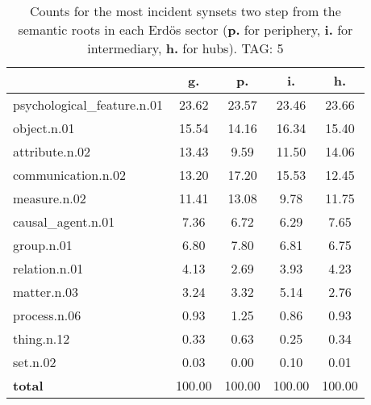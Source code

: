 \begin{table}[h!]
\begin{center}
\begin{tabular}{| l | c | c | c | c |}\hline
 & g. & p. & i. & h. \\\hline
psychological\_feature.n.01 & 23.62  & 23.57  & 23.46  & 23.66 \\\hline
object.n.01 & 15.54  & 14.16  & 16.34  & 15.40 \\\hline
attribute.n.02 & 13.43  & 9.59  & 11.50  & 14.06 \\\hline
communication.n.02 & 13.20  & 17.20  & 15.53  & 12.45 \\\hline
measure.n.02 & 11.41  & 13.08  & 9.78  & 11.75 \\\hline
causal\_agent.n.01 & 7.36  & 6.72  & 6.29  & 7.65 \\\hline
group.n.01 & 6.80  & 7.80  & 6.81  & 6.75 \\\hline
relation.n.01 & 4.13  & 2.69  & 3.93  & 4.23 \\\hline
matter.n.03 & 3.24  & 3.32  & 5.14  & 2.76 \\\hline
process.n.06 & 0.93  & 1.25  & 0.86  & 0.93 \\\hline
thing.n.12 & 0.33  & 0.63  & 0.25  & 0.34 \\\hline
set.n.02 & 0.03  & 0.00  & 0.10  & 0.01 \\\hline
{{\bf total}} & 100.00  & 100.00  & 100.00  & 100.00 \\\hline
\end{tabular}
\caption{Counts for the most incident synsets two step from the semantic roots in each Erd\"os sector ({\bf p.} for periphery, {\bf i.} for intermediary, {\bf h.} for hubs). TAG: 5}
\end{center}
\end{table}